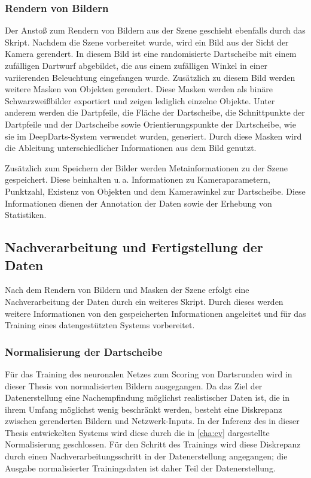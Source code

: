 \subsubsection{Rendern von Bildern}

Der Anstoß zum Rendern von Bildern aus der Szene geschieht ebenfalls durch das Skript. Nachdem die Szene vorbereitet wurde, wird ein Bild aus der Sicht der Kamera gerendert. In diesem Bild ist eine randomisierte Dartscheibe mit einem zufälligen Dartwurf abgebildet, die aus einem zufälligen Winkel in einer variierenden Beleuchtung eingefangen wurde. Zusätzlich zu diesem Bild werden weitere Masken von Objekten gerendert. Diese Masken werden als binäre Schwarzweißbilder exportiert und zeigen lediglich einzelne Objekte. Unter anderem werden die Dartpfeile, die Fläche der Dartscheibe, die Schnittpunkte der Dartpfeile und der Dartscheibe sowie Orientierungspunkte der Dartscheibe, wie sie im DeepDarts-System verwendet wurden, generiert. Durch diese Masken wird die Ableitung unterschiedlicher Informationen aus dem Bild genutzt.

Zusätzlich zum Speichern der Bilder werden Metainformationen zu der Szene gespeichert. Diese beinhalten u.\,a. Informationen zu Kameraparametern, Punktzahl, Existenz von Objekten und dem Kamerawinkel zur Dartscheibe. Diese Informationen dienen der Annotation der Daten sowie der Erhebung von Statistiken.


\subsection{Nachverarbeitung und Fertigstellung der Daten}  %
\label{sec:methodik_postprocessing}

Nach dem Rendern von Bildern und Masken der Szene erfolgt eine Nachverarbeitung der Daten durch ein weiteres Skript. Durch dieses werden weitere Informationen von den gespeicherten Informationen angeleitet und für das Training eines datengestützten Systems vorbereitet.

\subsubsection{Normalisierung der Dartscheibe}

Für das Training des neuronalen Netzes zum Scoring von Dartsrunden wird in dieser Thesis von normalisierten Bildern ausgegangen. Da das Ziel der Datenerstellung eine Nachempfindung möglichst realistischer Daten ist, die in ihrem Umfang möglichst wenig beschränkt werden, besteht eine Diskrepanz zwischen gerenderten Bildern und Netzwerk-Inputs. In der Inferenz des in dieser Thesis entwickelten Systems wird diese durch die in \autoref{cha:cv} dargestellte Normalisierung geschlossen. Für den Schritt des Trainings wird diese Diskrepanz durch einen Nachverarbeitungsschritt in der Datenerstellung angegangen; die Ausgabe normalisierter Trainingsdaten ist daher Teil der Datenerstellung.

